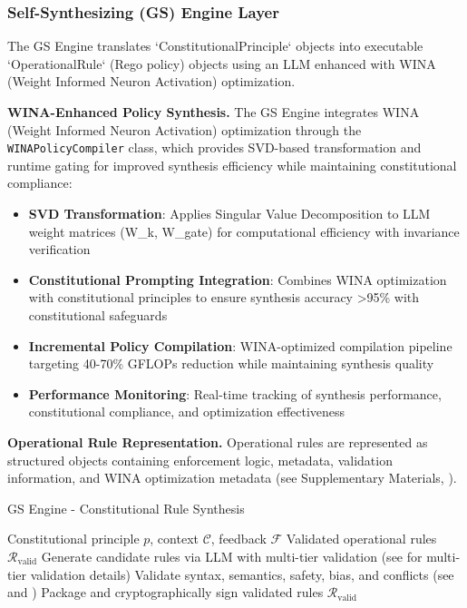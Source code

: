 \documentclass[manuscript,screen,review,anonymous,9pt]{acmart}
\begin{document}
\subsubsection{Self-Synthesizing (GS) Engine Layer}
The GS Engine translates `ConstitutionalPrinciple` objects into executable `OperationalRule` (Rego policy) objects using an LLM enhanced with WINA (Weight Informed Neuron Activation) optimization.

\textbf{WINA-Enhanced Policy Synthesis.} The GS Engine integrates WINA (Weight Informed Neuron Activation) optimization \cite{WINA2024NeuronActivation} through the \texttt{WINAPolicyCompiler} class, which provides SVD-based transformation and runtime gating for improved synthesis efficiency while maintaining constitutional compliance:

\begin{itemize}
	\item \textbf{SVD Transformation}: Applies Singular Value Decomposition to LLM weight matrices (W\_k, W\_gate) for computational efficiency with invariance verification \cite{SVDOptimization2024}
	\item \textbf{Constitutional Prompting Integration}: Combines WINA optimization with constitutional principles to ensure synthesis accuracy >95\% with constitutional safeguards \cite{ConstitutionalCompliance2024}
	\item \textbf{Incremental Policy Compilation}: WINA-optimized compilation pipeline targeting 40-70\% GFLOPs reduction while maintaining synthesis quality
	\item \textbf{Performance Monitoring}: Real-time tracking of synthesis performance, constitutional compliance, and optimization effectiveness \cite{PerformanceMonitoring2024}
\end{itemize}

\textbf{Operational Rule Representation.} Operational rules are represented as structured objects containing enforcement logic, metadata, validation information, and WINA optimization metadata (see Supplementary Materials, ).

\begin{algorithm}[!htbp]
	\caption{GS Engine - Constitutional Rule Synthesis}
	\label{alg:gs_engine}
	\begin{algorithmic}[1]
		\Require Constitutional principle $p$, context $\mathcal{C}$, feedback $\mathcal{F}$
		\Ensure Validated operational rules $\mathcal{R}_{\text{valid}}$
		\State Generate candidate rules via LLM with multi-tier validation (see  for multi-tier validation details)
		\State Validate syntax, semantics, safety, bias, and conflicts (see  and )
		\State Package and cryptographically sign validated rules
		\State \Return $\mathcal{R}_{\text{valid}}$
		\EndFunction
	\end{algorithmic}
\end{algorithm}
\end{document}
